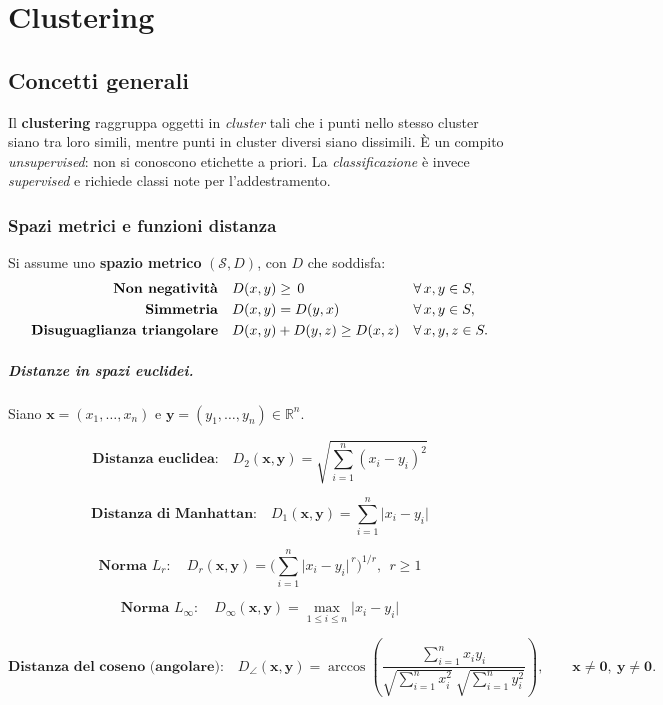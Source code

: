 \chapter{Clustering}\label{ch:clustering}

\section{Concetti generali}\label{sec:clu-concetti}
Il \textbf{clustering} raggruppa oggetti in \emph{cluster} tali che i punti nello stesso cluster siano tra loro simili, mentre punti in cluster diversi siano dissimili. È un compito \emph{unsupervised}: non si conoscono etichette a priori. La \emph{classificazione} è invece \emph{supervised} e richiede classi note per l’addestramento.

\subsection{Spazi metrici e funzioni distanza}\label{subsec:metric-spaces}
Si assume uno \textbf{spazio metrico} $(\mathcal{S},D)$, con $D$ che soddisfa:
\[
\begin{aligned}
\text{\textbf{Non negatività}}\quad & D(x,y) \ge \,0 && \forall\, x,y \in S,\\
\text{\textbf{Simmetria}}\quad & D(x,y) = D(y,x) && \forall\, x,y \in S,\\
\text{\textbf{Disuguaglianza triangolare}}\quad & D(x,y)+D(y,z) \ge D(x,z) && \forall\, x,y,z \in S.
\end{aligned}
\]

\paragraph{Distanze in spazi euclidei.}
Siano $\mathbf{x}=(x_1,\dots,x_n)$ e $\mathbf{y}=(y_1,\dots,y_n)\in\mathbb{R}^n$.

\[
\textbf{Distanza euclidea:}\quad
D_2(\mathbf{x},\mathbf{y})=\sqrt{\sum_{i=1}^{n}(x_i-y_i)^2}
\]

\[
\textbf{Distanza di Manhattan:}\quad
D_1(\mathbf{x},\mathbf{y})=\sum_{i=1}^{n}\lvert x_i-y_i\rvert
\]

\[
\textbf{Norma }L_r:\quad
D_r(\mathbf{x},\mathbf{y})=\Bigg(\sum_{i=1}^{n}\lvert x_i-y_i\rvert^{\,r}\Bigg)^{\!1/r},\ \ r\ge 1
\]

\[
\textbf{Norma }L_{\infty}:\quad
D_{\infty}(\mathbf{x},\mathbf{y})=\max_{1\le i\le n}\lvert x_i-y_i\rvert
\]

\[
\textbf{Distanza del coseno (angolare):}\quad
D_{\angle}(\mathbf{x},\mathbf{y})
=\arccos\!\left(
\frac{\sum_{i=1}^{n} x_i y_i}{\sqrt{\sum_{i=1}^{n} x_i^{2}}\ \sqrt{\sum_{i=1}^{n} y_i^{2}}}
\right),
\qquad \mathbf{x}\neq\mathbf{0},\ \mathbf{y}\neq\mathbf{0}.
\]



